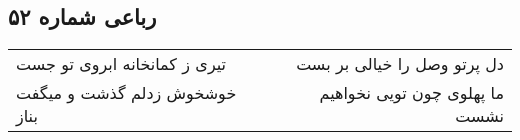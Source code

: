 \begin{center}
\section*{رباعی شماره ۵۲}
\label{sec:sh052}
\begin{longtable}{l p{0.5cm} r}
تیری ز کمانخانه ابروی تو جست
&&
دل پرتو وصل را خیالی بر بست
\\
خوشخوش زدلم گذشت و میگفت بناز
&&
ما پهلوی چون تویی نخواهیم نشست
\\
\end{longtable}
\end{center}
